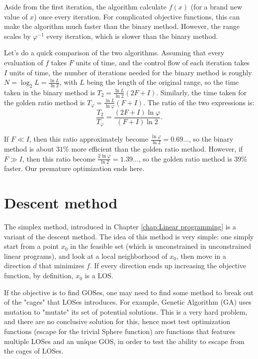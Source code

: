 Aside from the first iteration, the algorithm calculate \( f(x) \) (for a brand
new value of \( x \)) once every
iteration. For complicated objective functions, this can make the algorithm much
faster than the binary method. However, the range scales by \( \varphi^{-1} \)
every iteration, which is slower than the binary method.

Let's do a quick comparison of the two algorithms. Assuming that every
evaluation of \( f \) takes \( F \) units of time, and the control flow of each
iteration takes \( I \) units of time, the number of iterations
needed for the binary method is roughly \( N = \log_{2} L = \frac{\ln L}{\ln  2}
\), with \( L \) being the length of the original range, so the time taken in
the binary method is \( T_{2} = \frac{\ln L}{\ln  2}(2F + I) \). Similarly, the time
taken for the golden ratio method is \( T_{\varphi} = \frac{\ln L}{\ln
\varphi}(F + I) \). The ratio of the two expressions is:
\[
  \frac{T_{2}}{T_{\varphi}} = \frac{(2F + I)\ln \varphi}{(F + I)\ln 2}
.\]

If \( F \ll I \), then this ratio approximately become \( \frac{\ln \varphi}{\ln
2} = 0.69\ldots  \), so the binary method is about \( 31\% \) more efficient
than the golden ratio method. However, if \( F \gg I \), then this ratio become
\( \frac{2 \ln \varphi}{\ln 2} = 1.39\ldots  \), so the golden ratio method is
\( 39\% \) faster. Our premature optimization ends here.



\section{Descent method} %
\label{sec:Descent method}

The simplex method, introduced in Chapter \ref{chap:Linear programming} is a
variant of the descent method. The idea of this method is very simple: one
simply start from a point \( x_{0} \) in the feasible set (which is
unconstrained in unconstrained linear programs), and look at a local
neighborhood of \( x_{0} \), then move in a direction \( d \) that minimizes \(
f\). If every direction ends up increasing the objective function, by
definition, \( x_{0} \) is a LOS.

If the objective is to find GOSes, one may need to find some method to break out
of the "cages" that LOSes introduces. For example, Genetic Algorithm (GA) uses
mutation to "mutate" its set of potential solutions. This is a very hard
problem, and there are no conclusive solution for this, hence most test
optimization functions (escape for the trivial Sphere function)
are functions that features multiple LOSes and an unique
GOS, in order to test the ability to escape from the cages of LOSes.

